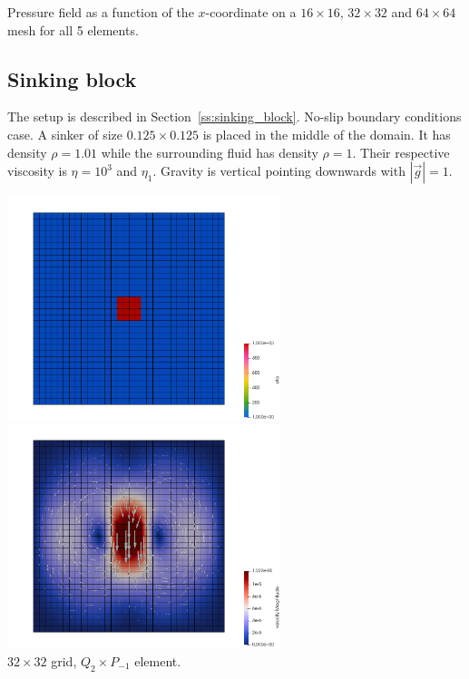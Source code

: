 \begin{center}
{\captionfont Pressure field as a function of the $x$-coordinate on a $16\times16$,
$32\times 32$ and $64\times 64$ mesh for all 5 elements.} 
\end{center}



\newpage
\subsection*{Sinking block}

The setup is described in Section~\ref{ss:sinking_block}. No-slip boundary conditions case.
A sinker of size $0.125\times 0.125$ is placed in the middle of the domain. It has density
$\rho=1.01$ while the surrounding fluid has density $\rho=1$. Their respective viscosity is
$\eta=10^3$ and $\eta_1$. Gravity is vertical pointing downwards with $|\vec g|=1$.


\begin{center}
\includegraphics[width=8cm]{python_codes/fieldstone_112/results/exp2/eta}
\includegraphics[width=8cm]{python_codes/fieldstone_112/results/exp2/vel}\\
{\captionfont $32\times 32$ grid, $Q_2\times P_{-1}$ element.}
\end{center}

